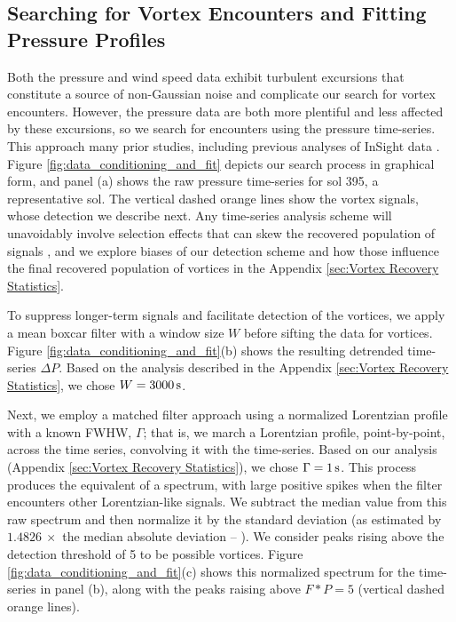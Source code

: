 \documentclass[linenumbers,trackchanges]{aastex63}
\begin{document}
\subsection{Searching for Vortex Encounters and Fitting Pressure Profiles}
\label{sec:Searching for Vortex Encounters and Fitting Pressure Profiles}
Both the pressure and wind speed data exhibit turbulent excursions that constitute a source of non-Gaussian noise and complicate our search for vortex encounters. However, the pressure data are both more plentiful and less affected by these excursions, so we search for encounters using the pressure time-series. This approach  many prior studies, including previous analyses of InSight data \citep{Spiga2021, 2021Icar..35514119L}. Figure \ref{fig:data_conditioning_and_fit} depicts our search process in graphical form, and panel (a) shows the raw pressure time-series for sol 395, a representative sol. The vertical dashed orange lines show the vortex signals, whose detection we describe next. Any time-series analysis scheme will unavoidably involve selection effects that can skew the recovered population of signals \citep{2018Icar..299..166J}, and we explore biases of our detection scheme and how those influence the final recovered population of vortices in the Appendix \ref{sec:Vortex Recovery Statistics}. 

To suppress longer-term signals and facilitate detection of the vortices, we apply a mean boxcar filter with a window size $W$ before sifting the data for vortices. Figure \ref{fig:data_conditioning_and_fit}(b) shows the resulting detrended time-series $\Delta P$. Based on the analysis described in the Appendix \ref{sec:Vortex Recovery Statistics}, we chose $W = 3000\,{\rm s}$. 

Next, we employ a matched filter approach \citep[][ch.~13]{Press2007} using a normalized Lorentzian profile with a known FWHW, $\Gamma$; that is, we march a Lorentzian profile, point-by-point, across the time series, convolving it with the time-series. Based on our analysis (Appendix \ref{sec:Vortex Recovery Statistics}), we chose $\Gamma = 1\,{\rm s}$. This process produces the equivalent of a spectrum, with large positive spikes when the filter encounters other Lorentzian-like signals. We subtract the median value from this raw spectrum and then normalize it by the standard deviation (as estimated by $1.4826\ \times$ the median absolute deviation -- \citealp{doi:10.1080/01621459.1993.10476408}). We consider peaks rising above the detection threshold of 5 to be possible vortices. Figure \ref{fig:data_conditioning_and_fit}(c) shows this normalized spectrum for the time-series in panel (b), along with the peaks raising above $F \ast P = 5$ (vertical dashed orange lines). 
\end{document}
